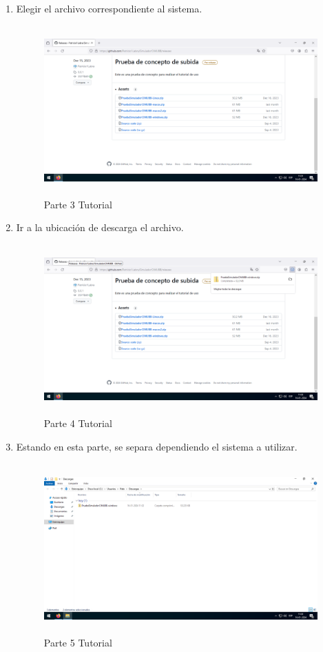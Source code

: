 \begin{enumerate}[label=\arabic*.-]
    \item Elegir el archivo correspondiente al sistema.
\begin{figure}[ht]
    \centering
    \includegraphics[width=10.5cm, height=6.5cm]{figures/TutorialWindows/tutorial (3).png}
    \caption{Parte 3 Tutorial}
    \label{fig:tuto3}
\end{figure}

\clearpage
    \item Ir a la ubicación de descarga el archivo.
\begin{figure}[ht]
    \centering
    \includegraphics[width=10.5cm, height=6.5cm]{figures/TutorialWindows/tutorial (4).png}
    \caption{Parte 4 Tutorial}
    \label{fig:tuto4}
\end{figure}

    \item Estando en esta parte, se separa dependiendo el sistema a utilizar.
\begin{figure}[ht]
    \centering
    \includegraphics[width=10.5cm, height=6.5cm]{figures/TutorialWindows/tutorial (5).png}
    \caption{Parte 5 Tutorial}
    \label{fig:tuto5}
\end{figure}
\end{enumerate}
\clearpage

